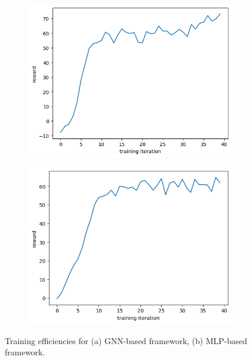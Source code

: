 \documentclass[letterpaper]{article}
\begin{document}
\begin{figure}[h!]
    \centering
    \begin{subfigure}[b]{0.45\textwidth}
        \includegraphics[width=\textwidth]{figure/gnn_training.png}
        \caption{}
    \end{subfigure}
    \begin{subfigure}[b]{0.45\textwidth}
        \includegraphics[width=\textwidth]{figure/mlp_training.png}
        \caption{}
    \end{subfigure}
    \caption{Training efficiencies for (a) GNN-based framework, (b) MLP-based framework.}
    \label{fig:training}
\end{figure}
\end{document}
